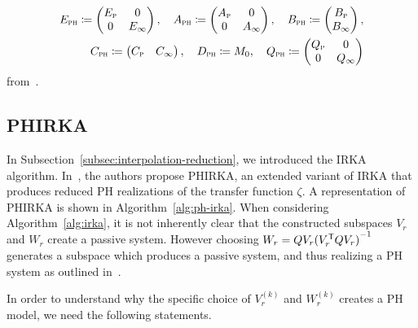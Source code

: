 \begin{equation}\label{eq:prbt-ph-system}
    \begin{aligned}
        E_{\textnormal{\scshape ph}} \coloneqq \begin{pmatrix}
            E_{\textnormal{\scshape p}} & 0 \\
            0 & E_\infty
        \end{pmatrix},\quad A_{\textnormal{\scshape ph}} \coloneqq \begin{pmatrix}
            A_{\textnormal{\scshape p}} & 0 \\
            0 & A_\infty
        \end{pmatrix},\quad B_{\textnormal{\scshape ph}} \coloneqq \begin{pmatrix}
            B_{\textnormal{\scshape p}} \\
            B_\infty
        \end{pmatrix}, \\
        C_{\textnormal{\scshape ph}} \coloneqq \begin{pmatrix}
            C_{\textnormal{\scshape p}} & C_\infty
        \end{pmatrix},\quad D_{\textnormal{\scshape ph}} \coloneqq M_0,\quad Q_{\textnormal{\scshape ph}} \coloneqq \begin{pmatrix}
            Q_{\textnormal{\scshape p}} & 0 \\
            0 & Q_\infty
        \end{pmatrix}
    \end{aligned}
\end{equation}
from~\cite[Lemma~5.6]{CGH2022}.

\subsection{\acl{PHIRKA}}\label{subsec:ph-irka}

In Subsection~\ref{subsec:interpolation-reduction}, we introduced the \ac{IRKA} algorithm.
In~\cite{Gugercin2012}, the authors propose \acf{PHIRKA}, an extended variant of \ac{IRKA} that produces reduced \ac{PH} realizations of the transfer function $\zeta$.
A representation of \ac{PHIRKA} is shown in Algorithm~\ref{alg:ph-irka}.
When considering Algorithm~\ref{alg:irka}, it is not inherently clear that the constructed subspaces $V_r$ and $W_r$ create a passive system.
However choosing $W_r = Q V_r {(V_r^{\mkern1mu \mathsf{T}} Q V_r)}^{-1}$ generates a subspace which produces a passive system, and thus realizing a \ac{PH} system as outlined in~\cite[Section~2.4]{Breiten2022}.

In order to understand why the specific choice of $V_r^{(k)}$ and $W_r^{(k)}$ creates a \ac{PH} model, we need the following statements.

